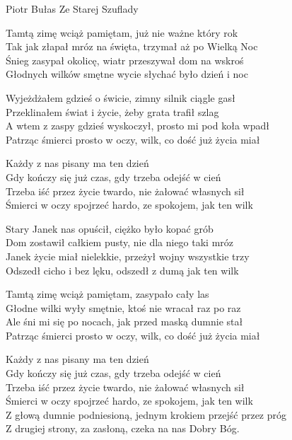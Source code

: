{Piotr Bułas}
{Ze Starej Szuflady}
\begin{text}
Tamtą zimę wciąż pamiętam, już nie ważne który rok\\
Tak jak złapał mróz na święta, trzymał aż po Wielką Noc\\
Śnieg zasypał okolicę, wiatr przeszywał dom na wskroś\\
Głodnych wilków smętne wycie słychać było dzień i noc

Wyjeżdżałem gdzieś o świcie, zimny silnik ciągle gasł\\
Przeklinałem świat i życie, żeby grata trafił szlag\\
A wtem z zaspy gdzieś wyskoczył, prosto mi pod koła wpadł\\
Patrząc śmierci prosto w oczy, wilk, co dość już życia miał

\vin Każdy z nas pisany ma ten dzień\\
\vin Gdy kończy się już czas, gdy trzeba odejść w cień\\
\vin Trzeba iść przez życie twardo, nie żałować własnych sił\\
\vin Śmierci w oczy spojrzeć hardo, ze spokojem, jak ten wilk

Stary Janek nas opuścił, ciężko było kopać grób\\
Dom zostawił całkiem pusty, nie dla niego taki mróz\\
Janek życie miał nielekkie, przeżył wojny wszystkie trzy\\
Odszedł cicho i bez lęku, odszedł z dumą jak ten wilk

Tamtą zimę wciąż pamiętam, zasypało cały las\\
Głodne wilki wyły smętnie, ktoś nie wracał raz po raz\\
Ale śni mi się po nocach, jak przed maską dumnie stał\\
Patrząc śmierci prosto w oczy, wilk, co dość już życia miał

\vin Każdy z nas pisany ma ten dzień\\
\vin Gdy kończy się już czas, gdy trzeba odejść w cień\\
\vin Trzeba iść przez życie twardo, nie żałować własnych sił\\
\vin Śmierci w oczy spojrzeć hardo, ze spokojem, jak ten wilk\\
\vin Z głową dumnie podniesioną, jednym krokiem przejść przez próg\\
\vin Z drugiej strony, za zasłoną, czeka na nas Dobry Bóg.
\end{text}
